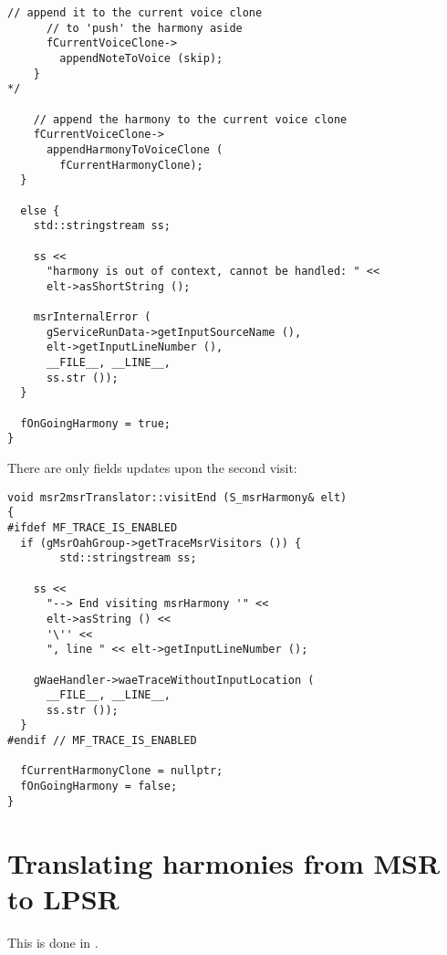 \begin{lstlisting}[language=CPlusPlus]
      // append it to the current voice clone
      // to 'push' the harmony aside
      fCurrentVoiceClone->
        appendNoteToVoice (skip);
    }
*/

    // append the harmony to the current voice clone
    fCurrentVoiceClone->
      appendHarmonyToVoiceClone (
        fCurrentHarmonyClone);
  }

  else {
    std::stringstream ss;

    ss <<
      "harmony is out of context, cannot be handled: " <<
      elt->asShortString ();

    msrInternalError (
      gServiceRunData->getInputSourceName (),
      elt->getInputLineNumber (),
      __FILE__, __LINE__,
      ss.str ());
  }

  fOnGoingHarmony = true;
}
\end{lstlisting}

There are only fields updates upon the second visit:
\begin{lstlisting}[language=CPlusPlus]
void msr2msrTranslator::visitEnd (S_msrHarmony& elt)
{
#ifdef MF_TRACE_IS_ENABLED
  if (gMsrOahGroup->getTraceMsrVisitors ()) {
		std::stringstream ss;

    ss <<
      "--> End visiting msrHarmony '" <<
      elt->asString () <<
      '\'' <<
      ", line " << elt->getInputLineNumber ();

    gWaeHandler->waeTraceWithoutInputLocation (
      __FILE__, __LINE__,
      ss.str ());
  }
#endif // MF_TRACE_IS_ENABLED

  fCurrentHarmonyClone = nullptr;
  fOnGoingHarmony = false;
}
\end{lstlisting}


\section{Translating harmonies from MSR to LPSR}

This is done in \msrToLpsr{}.

